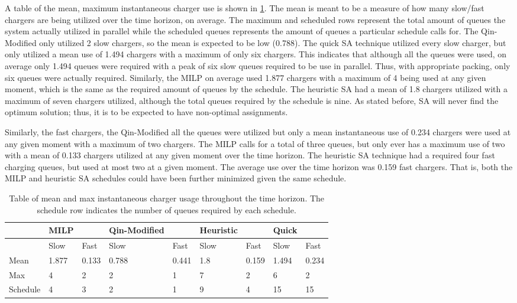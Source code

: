 \documentclass[ee,thesis]{usuthesis}
\begin{document}
A table of the mean, maximum instantaneous charger use is shown in \ref{tab:charge-count}. The mean is meant to be a
measure of how many slow/fast chargers are being utilized over the time horizon, on average. The maximum and scheduled
rows represent the total amount of queues the system actually utilized in parallel while the scheduled queues represents
the amount of queues a particular schedule calls for. The Qin-Modified only utilized 2 slow chargers, so the mean is
expected to be low (0.788). The quick SA technique utilized every slow charger, but only utilized a mean use of 1.494
chargers with a maximum of only six chargers. This indicates that although all the queues were used, on average only
1.494 queues were required with a peak of six slow queues required to be use in parallel. Thus, with appropriate
packing, only six queues were actually required. Similarly, the MILP on average used 1.877 chargers with a maximum of 4
being used at any given moment, which is the same as the required amount of queues by the schedule. The heuristic SA had
a mean of 1.8 chargers utilized with a maximum of seven chargers utilized, although the total queues required by the
schedule is nine. As stated before, SA will never find the optimum solution; thus, it is to be expected to have
non-optimal assignments.

Similarly, the fast chargers, the Qin-Modified all the queues were utilized but only a mean instantaneous use of 0.234
chargers were used at any given moment with a maximum of two chargers. The MILP calls for a total of three queues, but
only ever has a maximum use of two with a mean of 0.133 chargers utilized at any given moment over the time horizon. The
heuristic SA technique had a required four fast charging queues, but used at most two at a given moment. The average use
over the time horizon was 0.159 fast chargers. That is, both the MILP and heuristic SA schedules could have been further
minimized given the same schedule.

\begin{table}[htbp]
\caption{\label{tab:charge-count}Table of mean and max instantaneous charger usage throughout the time horizon. The schedule row indicates the number of queues required by each schedule.}
\centering
\begin{tabular}{|l|ll|ll|ll|ll|}
\hline
 & MILP &  & Qin-Modified &  & Heuristic &  & Quick & \\[0pt]
\hline
 & Slow & Fast & Slow & Fast & Slow & Fast & Slow & Fast\\[0pt]
Mean & 1.877 & 0.133 & 0.788 & 0.441 & 1.8 & 0.159 & 1.494 & 0.234\\[0pt]
Max & 4 & 2 & 2 & 1 & 7 & 2 & 6 & 2\\[0pt]
Schedule & 4 & 3 & 2 & 1 & 9 & 4 & 15 & 15\\[0pt]
\hline
\end{tabular}
\end{table}
\end{document}
